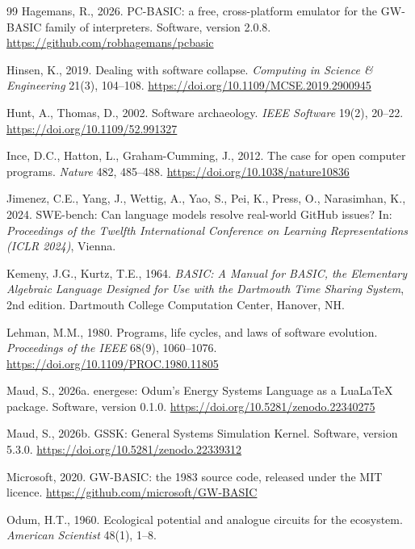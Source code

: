 \documentclass[11pt,a4paper]{article}
\begin{document}
\begin{thebibliography}{99}
Hagemans, R., 2026. PC-BASIC: a free, cross-platform emulator for the GW-BASIC family of interpreters. Software, version 2.0.8. \url{https://github.com/robhagemans/pcbasic}

Hinsen, K., 2019. Dealing with software collapse. \emph{Computing in Science \& Engineering} 21(3), 104--108. \url{https://doi.org/10.1109/MCSE.2019.2900945}

Hunt, A., Thomas, D., 2002. Software archaeology. \emph{IEEE Software} 19(2), 20--22. \url{https://doi.org/10.1109/52.991327}

Ince, D.C., Hatton, L., Graham-Cumming, J., 2012. The case for open computer programs. \emph{Nature} 482, 485--488. \url{https://doi.org/10.1038/nature10836}

Jimenez, C.E., Yang, J., Wettig, A., Yao, S., Pei, K., Press, O., Narasimhan, K., 2024. SWE-bench: Can language models resolve real-world GitHub issues? In: \emph{Proceedings of the Twelfth International Conference on Learning Representations (ICLR 2024)}, Vienna.

Kemeny, J.G., Kurtz, T.E., 1964. \emph{BASIC: A Manual for BASIC, the Elementary Algebraic Language Designed for Use with the Dartmouth Time Sharing System}, 2nd edition. Dartmouth College Computation Center, Hanover, NH.

Lehman, M.M., 1980. Programs, life cycles, and laws of software evolution. \emph{Proceedings of the IEEE} 68(9), 1060--1076. \url{https://doi.org/10.1109/PROC.1980.11805}

Maud, S., 2026a. energese: Odum's Energy Systems Language as a LuaLaTeX package. Software, version 0.1.0. \url{https://doi.org/10.5281/zenodo.22340275}

Maud, S., 2026b. GSSK: General Systems Simulation Kernel. Software, version 5.3.0. \url{https://doi.org/10.5281/zenodo.22339312}

Microsoft, 2020. GW-BASIC: the 1983 source code, released under the MIT licence. \url{https://github.com/microsoft/GW-BASIC}

Odum, H.T., 1960. Ecological potential and analogue circuits for the ecosystem. \emph{American Scientist} 48(1), 1--8.


\end{thebibliography}
\end{document}
